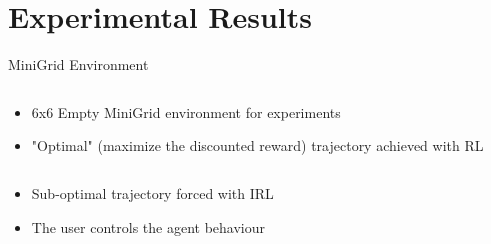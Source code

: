 \section{Experimental Results}

\begin{frame}{MiniGrid Environment}

\begin{columns}
        \begin{column}{0.6\textwidth}
        \small{        
            \begin{itemize}
                \item 6x6 Empty MiniGrid environment for experiments
                \item "Optimal" (maximize the discounted reward) trajectory achieved with RL
            \end{itemize}
        }
            
        \end{column}
        \begin{column}{0.4\textwidth}
        \end{column}
        
    \end{columns}

\begin{columns}
        \begin{column}{0.6\textwidth}
        \small{        
            \begin{itemize}
                \item Sub-optimal trajectory forced with IRL
                \item The user controls the agent behaviour
            \end{itemize}
        }
            

\end{column}
\end{columns}
\end{frame}
